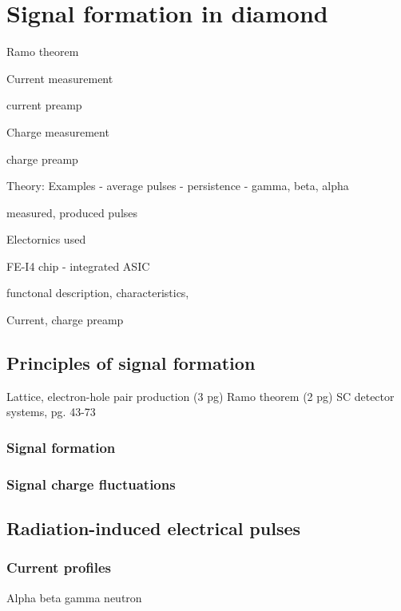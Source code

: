 \documentclass[11pt]{mytustyle}  %
\begin{document}
\baselineskip=16pt

\chapter{Signal formation in diamond}

Ramo theorem

Current measurement

current preamp

Charge measurement

charge preamp

Theory: Examples - average pulses - persistence - gamma, beta, alpha		

measured, produced pulses

Electornics used

FE-I4 chip - integrated ASIC

functonal description, characteristics,

Current, charge preamp


\section{Principles of signal formation}
Lattice, electron-hole pair production (3 pg)
Ramo theorem (2 pg)
SC detector systems, pg. 43-73
\subsection{Signal formation}
\subsection{Signal charge fluctuations}

\section{Radiation-induced electrical pulses}
\subsection{Current profiles}
Alpha
beta
gamma
neutron

\end{document}
